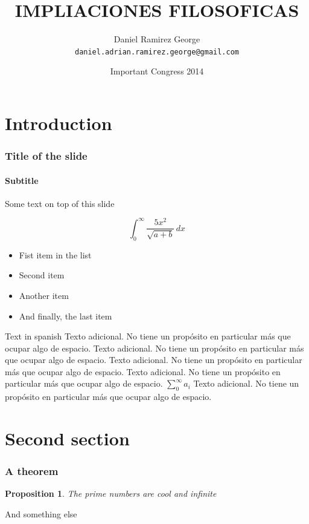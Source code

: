 \documentclass{beamer}
\title{IMPLIACIONES FILOSOFICAS}
\author{Daniel Ramirez George\\ %
	      \texttt{daniel.adrian.ramirez.george@gmail.com}} %
\date{Important Congress 2014} %
\institute{Institute of Mathematics, Great University} %
\newtheorem{proposition}{Proposition}
\begin{document}
\begin{frame}

  \titlepage %
  
\end{frame}


\begin{frame}
\tableofcontents %
\end{frame}

\section{Introduction} %
\begin{frame}
  \frametitle{Title of the slide}
  \framesubtitle{Subtitle} %
  Some text on top of this slide
  
  \[
   \int_{0}^{\infty} \frac{5x^2}{\sqrt{a+b}}\, dx
   \]

  \begin{itemize}
    \item[\checkmark] Fist item in the list %
    \item Second item
    \item Another item
    \item And finally, the last item
  \end{itemize}
\end{frame}

\begin{frame}{Text in spanish} %
Texto adicional. No tiene un propósito en particular más que ocupar algo de espacio.
Texto adicional. No tiene un propósito en particular más que ocupar algo de espacio.
Texto adicional. No tiene un propósito en particular más que ocupar algo de espacio.
Texto adicional. No tiene un propósito en particular más que ocupar algo de espacio.
\( \sum_0^{\infty} a_i \) 
Texto adicional. No tiene un propósito en particular más que ocupar algo de espacio.
\end{frame}

\section{Second section} %
\begin{frame}
    \frametitle{A theorem}
    
    \begin{proposition} %
        The prime numbers are cool and infinite
    \end{proposition}
    
    And something else

\end{frame}
\end{document}
